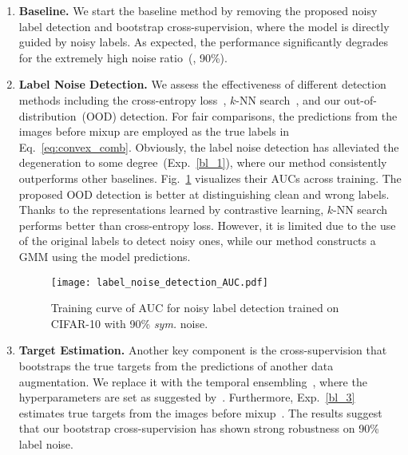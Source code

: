 \begin{enumerate}[label=\color{red!70!black}(\roman*),wide,labelindent=0pt,itemsep=0ex,parsep=0pt,topsep=0pt]
\item\label{bl_1} \textbf{Baseline.}\quad
We start the baseline method by removing the proposed noisy label detection and bootstrap cross-supervision, where the model is directly guided by noisy labels.  As expected, the performance significantly degrades for the extremely high noise ratio~(\ie, 90\%).


\item\label{bl_2} \textbf{Label Noise Detection.}\quad
We assess the effectiveness of different detection methods including the cross-entropy loss~\cite{arazo2019unsupervised,li2020dividemix}, $k$-NN search~\cite{ortego2021multi}, and our out-of-distribution~(OOD) detection. For fair comparisons, the predictions from the images before mixup are employed as the true labels in Eq.~\eqref{eq:convex_comb}.
Obviously, the label noise detection has alleviated the degeneration to some degree~(Exp.~\ref{bl_1}), where our method consistently outperforms other baselines.
Fig.~\ref{fig:label_noise_detection_AUC} visualizes their AUCs across training.
The proposed OOD detection is better at distinguishing clean and wrong labels. Thanks to the representations learned by contrastive learning, $k$-NN search performs better than cross-entropy loss. However, it is limited due to the use of the original labels to detect noisy ones, while our method constructs a GMM using the model predictions.

\begin{figure}[t]
    \centering
    \texttt{[image: label\_noise\_detection\_AUC.pdf]}
    \caption{
        Training curve of AUC for noisy label detection trained on CIFAR-10 with 90\% \textit{sym.} noise. 
    }
    \label{fig:label_noise_detection_AUC}\end{figure}

\item\label{bl_3} \textbf{Target Estimation.}\quad
Another key component is the cross-supervision that bootstraps the true targets from the predictions of another data augmentation. We replace it with the temporal ensembling~\cite{liu2020early}, where the hyperparameters are set as suggested by~\cite{liu2020early}. Furthermore, Exp.~\ref{bl_3} estimates true targets from the images before mixup~\cite{li2020dividemix,liu2020early,arazo2019unsupervised}. The results suggest that our bootstrap cross-supervision has shown strong robustness on 90\% label noise.


\end{enumerate}
